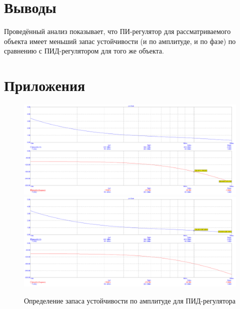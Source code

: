 \section{Выводы}
	Проведённый анализ показывает, что ПИ-регулятор для рассматриваемого объекта имеет меньший запас устойчивости (и по амплитуде, и по фазе) по сравнению с ПИД-регулятором для того же объекта.
\section{Приложения}
	\begin{figure}[H]
		\centering
		\includegraphics[scale=0.35]{./images/3.png}
		\includegraphics[scale=0.35]{./images/4.png}
		\caption{Определение запаса устойчивости по амплитуде для ПИД-регулятора} 
	\end{figure}
	
